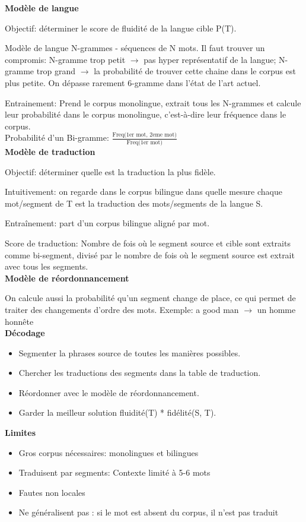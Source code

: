 \textbf{Modèle de langue}

Objectif: déterminer le score de fluidité de la langue cible P(T).

Modèle de langue N-grammes - séquences de N mots. Il faut trouver un compromis: N-gramme trop petit $\rightarrow$ pas hyper représentatif de la langue; N-gramme trop grand $\rightarrow$ la probabilité de trouver cette chaine dans le corpus est plus petite. On dépasse rarement 6-gramme dans l'état de l'art actuel.

Entrainement: Prend le corpus monolingue, extrait tous les N-grammes et calcule leur probabilité dans le corpus monolingue, c’est-à-dire leur fréquence dans le corpus. \\

Probabilité d'un Bi-gramme: $ \frac{ \text{Freq(1er mot, 2eme mot)}}{\text{Freq(1er mot)}} $ \\

\textbf{Modèle de traduction}

Objectif: déterminer quelle est la traduction la plus fidèle.

Intuitivement: on regarde dans le corpus bilingue dans quelle mesure chaque mot/segment de T est la traduction des mots/segments de la langue S.

Entraînement: part d'un corpus bilingue aligné par mot.

Score de traduction: Nombre de fois où le segment source et cible sont extraits comme bi-segment, divisé par le nombre de fois où le segment source est extrait avec tous les segments.\\

\textbf{Modèle de réordonnancement}

On calcule aussi la probabilité qu’un segment change de place, ce qui permet de traiter des changements d’ordre des mots. Exemple: a good man $\rightarrow$ un homme honnête\\

\textbf{Décodage}

\begin{itemize}
    \item Segmenter la phrases source de toutes les manières possibles.
    \item Chercher les traductions des segments dans la table de traduction.
    \item Réordonner avec le modèle de réordonnancement.
    \item Garder la meilleur solution fluidité(T) * fidélité(S, T).
\end{itemize}


\textbf{Limites}

\begin{itemize}
    \item Gros corpus nécessaires: monolingues et bilingues
    \item Traduisent par segments: Contexte limité à 5-6 mots
    \item Fautes non locales
    \item Ne généralisent pas : si le mot est absent du corpus, il n’est pas traduit\\
\end{itemize}





